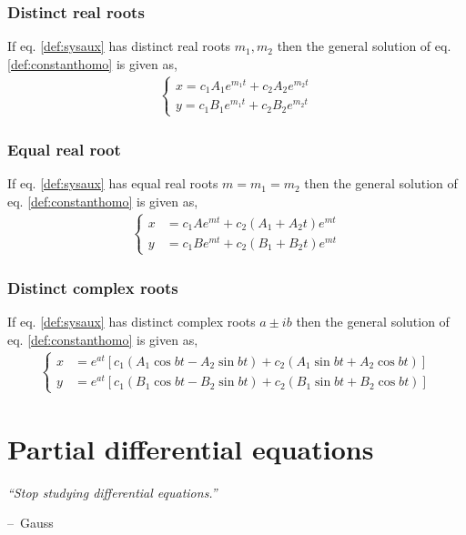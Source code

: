 \documentclass[oneside,11pt,pdftex,final]{book}%
\makeatletter
\numberwithin{equation}{section}
\newenvironment{chapquote}[2][2em]
{\setlength{\@tempdima}{#1}%
	\def\chapquote@author{#2}%
	\parshape 1 \@tempdima \dimexpr\textwidth-2\@tempdima\relax%
	\itshape}
{\par\normalfont\hfill--\ \chapquote@author\hspace*{\@tempdima}\par\bigskip}
\numberwithin{section}{chapter}
\numberwithin{equation}{chapter}
\makeatother
\begin{document}
\subsection{Distinct real roots}
If eq. \ref{def:sysaux} has distinct real roots $ m_1, m_2 $ then the general solution of eq. \ref{def:constanthomo} is given as,
\begin{align*}
	\begin{cases}
		x=c_1A_1e^{m_1t}+c_2A_2e^{m_2t}\\
		y=c_1B_1e^{m_1t}+c_2B_2e^{m_2t}
	\end{cases}
\end{align*}

\subsection{Equal real root}
If eq. \ref{def:sysaux} has equal real roots $m= m_1=m_2 $ then the general solution of eq. \ref{def:constanthomo} is given as,
\begin{align*}
	\begin{cases}
		x&=c_1Ae^{mt}+c_2(A_1+A_2t)e^{mt}\\
		y&=c_1Be^{mt}+c_2(B_1+B_2t)e^{mt}
	\end{cases}
\end{align*}

\subsection{Distinct complex roots}
If eq. \ref{def:sysaux} has distinct complex roots $a\pm ib $ then the general solution of eq. \ref{def:constanthomo} is given as,
\begin{align*}
	\begin{cases}
		x&=e^{at}[c_1(A_1 \cos bt - A_2 \sin bt)+c_2(A_1 \sin bt + A_2 \cos bt)]\\
		y&=e^{at}[c_1(B_1 \cos bt- B_2 \sin bt)+c_2(B_1 \sin bt + B_2 \cos bt)]
	\end{cases}
\end{align*}

\chapter{Partial differential equations}

\begin{chapquote}{Gauss}
	``Stop studying differential equations.''
\end{chapquote}
\end{document}
